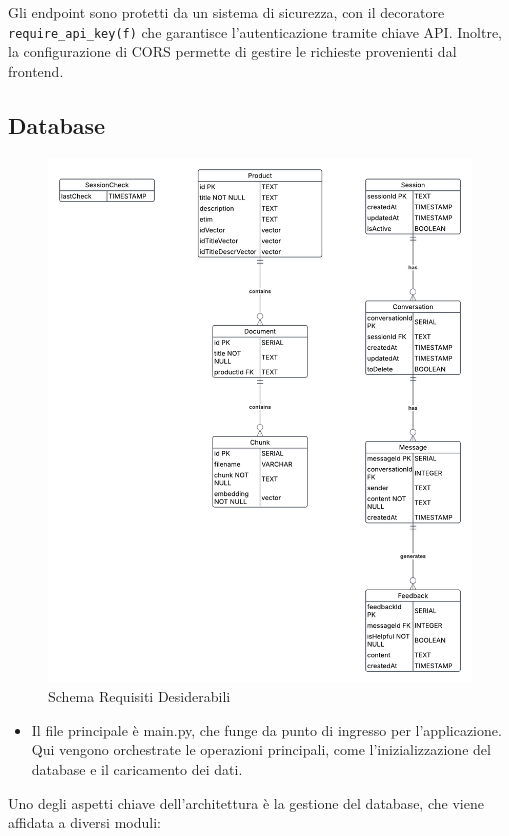 Gli endpoint sono protetti da un sistema di sicurezza, con il decoratore \texttt{require\_api\_key(f)} che garantisce l’autenticazione tramite chiave API. Inoltre, la configurazione di CORS permette di gestire le richieste provenienti dal frontend.

\subsection{Database}
\begin{figure}[H]
    \centering
    \includegraphics[width=\textwidth]{images/database.png}
    \caption{Schema Requisiti Desiderabili}
    \label{fig:Requisiti Desiderabili}
\end{figure}

\begin{itemize}
\item Il file principale è main.py, che funge da punto di ingresso per l'applicazione. Qui vengono orchestrate le operazioni principali, come l'inizializzazione del database e il caricamento dei dati.
\end{itemize}
Uno degli aspetti chiave dell'architettura è la gestione del database, che viene affidata a diversi moduli:

